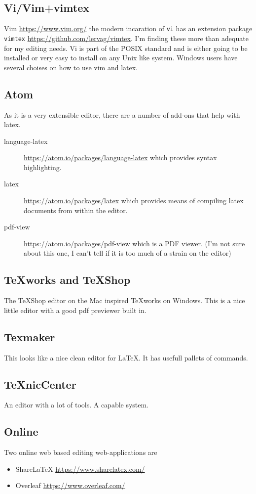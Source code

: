 \subsection{Vi/Vim+vimtex}
Vim \url{https://www.vim.org/} the modern incaration of \texttt{vi} has an
extension package \texttt{vimtex} \url{https://github.com/lervag/vimtex}.
I'm finding these more than adequate for my editing needs.  Vi is part of the
POSIX standard and is either going to be installed or very easy to install on
any Unix like system. Windows users have several choises on how to use vim and
latex.

\subsection{Atom}
As it is a very extensible editor, there are a number of add-ons that help with latex.

\begin{description}
    \item[language-latex] \url{https://atom.io/packages/language-latex} which provides syntax highlighting.
    \item[latex] \url{https://atom.io/packages/latex} which provides means of compiling latex documents from within the editor.
    \item[pdf-view] \url{https://atom.io/packages/pdf-view} which is a PDF viewer.  (I'm not sure about this one, I can't tell if it is too much of a strain on the editor)
\end{description}

\subsection{TeXworks and TeXShop}
The TeXShop editor on the Mac inspired TeXworks on Windows.  This is a nice little editor with a good pdf previewer built in.

\subsection{Texmaker}
    This looks like a nice clean editor for LaTeX.  It has  usefull pallets of commands.
\subsection{TeXnicCenter}
    An editor with a lot of tools.
    A  capable system.
\subsection{Online}
Two online web based editing web-applications are
\begin{itemize}
  \item ShareLaTeX \url{https://www.sharelatex.com/}
  \item Overleaf  \url{https://www.overleaf.com/}
\end{itemize}

